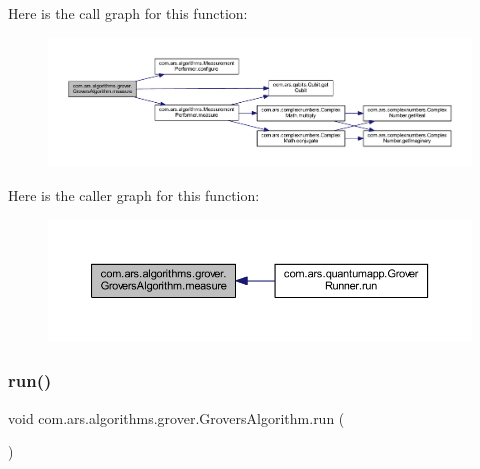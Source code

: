 Here is the call graph for this function\+:\nopagebreak
\begin{figure}[H]
\begin{center}
\leavevmode
\includegraphics[width=350pt]{classcom_1_1ars_1_1algorithms_1_1grover_1_1_grovers_algorithm_a8b5729e4882c27f2c4879bd2c7b6d17d_cgraph}
\end{center}
\end{figure}
Here is the caller graph for this function\+:\nopagebreak
\begin{figure}[H]
\begin{center}
\leavevmode
\includegraphics[width=350pt]{classcom_1_1ars_1_1algorithms_1_1grover_1_1_grovers_algorithm_a8b5729e4882c27f2c4879bd2c7b6d17d_icgraph}
\end{center}
\end{figure}
\hypertarget{classcom_1_1ars_1_1algorithms_1_1grover_1_1_grovers_algorithm_a4b7b6a2e63a64325769a5ebeffb90ea9}{}\label{classcom_1_1ars_1_1algorithms_1_1grover_1_1_grovers_algorithm_a4b7b6a2e63a64325769a5ebeffb90ea9} 
\subsubsection{\texorpdfstring{run()}{run()}}
{\footnotesize\ttfamily void com.\+ars.\+algorithms.\+grover.\+Grovers\+Algorithm.\+run (\begin{DoxyParamCaption}{ }\end{DoxyParamCaption})}

